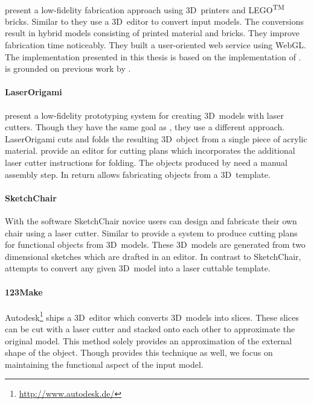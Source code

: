 \documentclass[../ClassicThesis.tex]{subfiles}
\begin{document}
\paragraph{{\brickify}} \citeauthor{bachelor-thesis} present
a low-fidelity fabrication approach using 3D~printers and
LEGO\textsuperscript{TM} bricks. Similar to {\platener} they
use a 3D~editor to convert input models. The conversions
result in hybrid models consisting of printed material and
bricks. They improve fabrication time noticeably. They built
a user-oriented web service using WebGL. The implementation
presented in this thesis is based on the implementation of
{\brickify}. {\brickify} is grounded on previous work by
\citeauthor{fabrickation}.


\paragraph{LaserOrigami} \citeauthor{laserorigami} present a
low-fidelity prototyping system for creating 3D~models with laser
cutters. Though they have the same goal as {\platener}, they use a
different approach. LaserOrigami cuts and folds the resulting
3D~object from a single piece of acrylic material.
\citeauthor{laserorigami} provide an editor for cutting plans which
incorporates the additional laser cutter instructions for folding. The
objects produced by {\platener} need a manual assembly step. In return
{\platener} allows fabricating objects from a 3D~template.


\paragraph{SketchChair} With the software SketchChair novice users can
design and fabricate their own chair using a laser cutter. Similar to
{\platener} \citeauthor{sketchchair} provide a system to produce
cutting plans for functional objects from 3D~models. These 3D~models
are generated from two dimensional sketches which are drafted in an
editor. In contrast to SketchChair, {\platener} attempts to convert
any given 3D~model into a laser cuttable template.


\paragraph{123Make} Autodesk\footnote{\url{http://www.autodesk.de/}}
ships a 3D~editor which converts 3D~models into slices. These slices
can be cut with a laser cutter and stacked onto each other to
approximate the original model. This method solely provides an
approximation of the external shape of the object. Though {\platener}
provides this technique as well, we focus on maintaining the
functional aspect of the input model.

\end{document}
